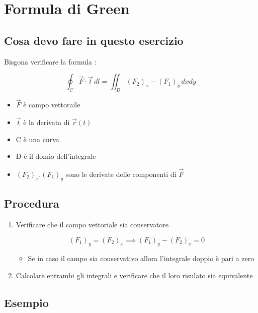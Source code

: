\chapter{Formula di Green}
\section{Cosa devo fare in questo esercizio}
Bisgona verificare la formula :
\begin{tcolorbox}[title={Formula di green}]
    {\large
    $$
    \oint_C \vec{F} \cdot \vec{t} \, dl = \iint_D (F_2)_x - (F_1)_y \, dxdy
    $$
    }
    \begin{itemize}
        \item $\vec{F}$ è campo vettoraile
        \item $\vec{t}$ è la derivata di $\vec{r}(t)$
        \item C è una curva
        \item D è il domio dell'integrale
        \item $(F_2)_x$,$ (F_1)_y$ sono le derivate delle componenti di $\vec{F}$
    \end{itemize}
\end{tcolorbox}

\section{Procedura}
\begin{enumerate}
    \item Verificare che il campo vettoriale sia conservatore 

    $$
    (F_1)_y = (F_2)_x \implies (F_1)_y - (F_2)_x = 0
    $$
    \begin{itemize}
        \item Se in caso il campo sia conservativo allora l'integrale doppio è pari a zero
    \end{itemize}

    \item Calcolare entrambi gli integrali e verificare che il loro risulato sia equivalente
\end{enumerate}
\section{Esempio}
